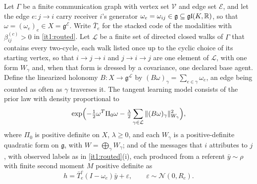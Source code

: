 Let $\Gamma$ be a finite communication graph with vertex set $\mathcal V$ and edge set $\mathcal E$, and let the edge $e:j\to i$ carry receiver $i$'s generator $\omega_e=\omega_{ij}\in\mathfrak g\subseteq\mathfrak{gl}(K,\mathbb R)$, so that $\omega=(\omega_e)_e\in X=\mathfrak g^{\mathcal E}$. Write $\bar T_e$ for the stacked code of the modalities with $\beta^{(c)}_{ij}>0$ in \cref{it1:routed}. Let $\mathcal L$ be a finite set of directed closed walks of $\Gamma$ that contains every two-cycle, each walk listed once up to the cyclic choice of its starting vertex, so that $i\to j\to i$ and $j\to i\to j$ are one element of $\mathcal L$, with one form $W_\gamma$ and, when that form is dressed by a covariance, one declared base agent. Define the linearized holonomy $B:X\to\mathfrak g^{\mathcal L}$ by $(B\omega)_\gamma=\sum_{e\in\gamma}\omega_e$, an edge being counted as often as $\gamma$ traverses it. The tangent learning model consists of the prior law with density proportional to
\begin{equation}
\exp\Bigl(-\tfrac12\omega^T\Pi_0\omega-\tfrac\lambda2\sum_{\gamma\in\mathcal L}\Vert(B\omega)_\gamma\Vert_{W_\gamma}^2\Bigr),
\label{it1:loop-prior}
\end{equation}
where $\Pi_0$ is positive definite on $X$, $\lambda\geq0$, and each $W_\gamma$ is a positive-definite quadratic form on $\mathfrak g$, with $W=\bigoplus_\gamma W_\gamma$; and of the messages that $i$ attributes to $j$, with observed labels as in \cref{it1:routed}(i), each produced from a referent $\bar y\sim\rho$ with finite second moment $M$ positive definite as
\begin{equation}
h=\bar T_e^c(I-\omega_e)\bar y+\varepsilon,\qquad\varepsilon\sim\mathcal N(0,R_c).
\label{it1:tangent-message}
\end{equation}

